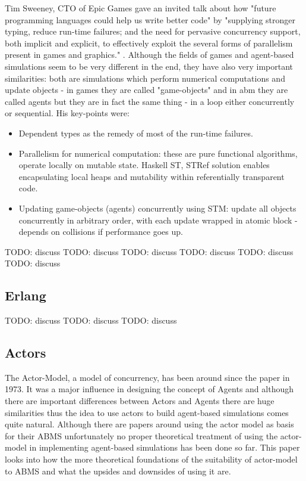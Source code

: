 Tim Sweeney, CTO of Epic Games gave an invited talk about how "future programming languages could help us write better code" by "supplying stronger typing, reduce run-time failures;  and the need for pervasive concurrency support, both implicit and explicit, to effectively exploit the several forms of parallelism present in games and graphics." \cite{Sweeney2006}. Although the fields of games and agent-based simulations seem to be very different in the end, they have also very important similarities: both are simulations which perform numerical computations and update objects - in games they are called "game-objects" and in abm they are called agents but they are in fact the same thing - in a loop either concurrently or sequential. His key-points were:

\begin{itemize}
\item Dependent types as the remedy of most of the run-time failures.
\item Parallelism for numerical computation: these are pure functional algorithms, operate locally on mutable state. Haskell ST, STRef solution enables encapsulating local heaps and mutability within referentially transparent code.
\item Updating game-objects (agents) concurrently using STM: update all objects concurrently in arbitrary order, with each update wrapped in atomic block - depends on collisions if performance goes up.
\end{itemize}

TODO: discuss \cite{Schneider_2012}
TODO: discuss \cite{Vendrov_2014}
TODO: discuss \cite{Sulzmann_2007}
TODO: discuss \cite{Jankovic_2007}
TODO: discuss \cite{DeJong_2014}
TODO: discuss \cite{sorokin_aivika_2015}

\subsection{Erlang}
TODO: discuss \cite{DiStefano_2007}
TODO: discuss \cite{DiStefano_2005}
TODO: discuss \cite{Varela_2004}

\subsection{Actors}
The Actor-Model, a model of concurrency, has been around since the paper \cite{Hewitt_1973} in 1973. It was a major influence in designing the concept of Agents and although there are important differences between Actors and Agents there are huge similarities thus the idea to use actors to build agent-based simulations comes quite natural. Although there are papers around using the actor model as basis for their ABMS unfortunately no proper theoretical treatment of using the actor-model in implementing agent-based simulations has been done so far. This paper looks into how the more theoretical foundations of the suitability of actor-model to ABMS and what the upsides and downsides of using it are.

